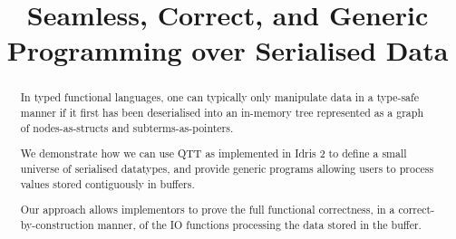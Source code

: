 \documentclass[10pt]{article}
\title{Seamless, Correct, and Generic \\ Programming over Serialised Data}
\author{\iftoggle{BLIND}{ANONYMOUS}{Guillaume Allais}}
\newcommand{\idris}{Idris 2}
\begin{document}
\maketitle

\begin{abstract}
In typed functional languages, one can typically only manipulate data
in a type-safe manner if it first has been deserialised into an in-memory
tree represented as a graph of nodes-as-structs and subterms-as-pointers.

We demonstrate how we can use QTT as implemented in \idris{} to define
a small universe of serialised datatypes, and provide generic programs
allowing users to process values stored contiguously in buffers.

Our approach allows implementors to prove the full functional correctness,
in a correct-by-construction manner, of the IO functions processing the
data stored in the buffer.
\end{abstract}















\newpage


\newpage
\appendix


\end{document}
